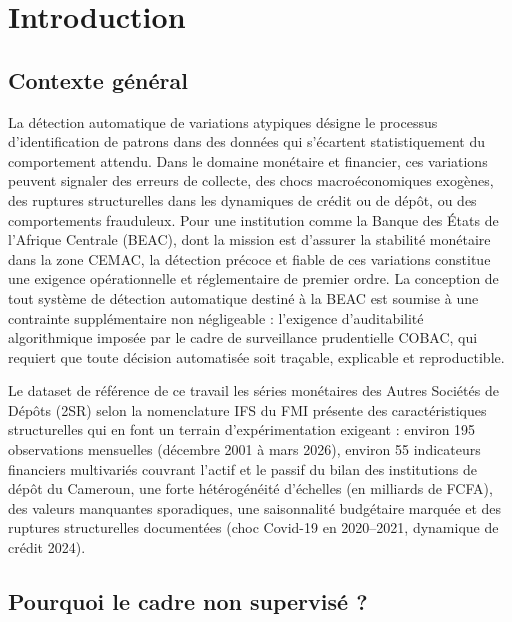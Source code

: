 \documentclass[12pt,a4paper]{article}
\begin{document}
\tableofcontents
\newpage

\section{Introduction}

\subsection{Contexte général}

La détection automatique de variations atypiques désigne le processus
d'identification de patrons dans des données qui s'écartent statistiquement du
comportement attendu. Dans le domaine monétaire et financier, ces variations
peuvent signaler des erreurs de collecte, des chocs macroéconomiques exogènes,
des ruptures structurelles dans les dynamiques de crédit ou de dépôt, ou des
comportements frauduleux. Pour une institution comme la Banque des États de
l'Afrique Centrale (BEAC), dont la mission est d'assurer la stabilité monétaire
dans la zone CEMAC, la détection précoce et fiable de ces variations constitue
une exigence opérationnelle et réglementaire de premier ordre. La conception de
tout système de détection automatique destiné à la BEAC est soumise à une
contrainte supplémentaire non négligeable : l'exigence d'auditabilité
algorithmique imposée par le cadre de surveillance prudentielle COBAC, qui
requiert que toute décision automatisée soit traçable, explicable et
reproductible.

Le dataset de référence de ce travail  les séries monétaires des Autres
Sociétés de Dépôts (2SR) selon la nomenclature IFS du FMI  présente des
caractéristiques structurelles qui en font un terrain d'expérimentation
exigeant : environ 195 observations mensuelles (décembre 2001 à mars 2026),
environ 55 indicateurs financiers multivariés couvrant l'actif et le passif
du bilan des institutions de dépôt du Cameroun, une forte hétérogénéité
d'échelles (en milliards de FCFA), des valeurs manquantes sporadiques, une
saisonnalité budgétaire marquée et des ruptures structurelles documentées
(choc Covid-19 en 2020--2021, dynamique de crédit 2024).

\subsection{Pourquoi le cadre non supervisé ?}
\end{document}
